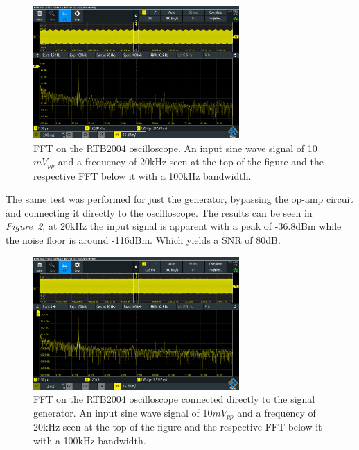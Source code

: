 \begin{figure}[h]
    \centering
    \includegraphics[width=0.7\textwidth]{graphics/Noise20k10mVpp100kband.PNG}
    \caption{FFT on the RTB2004 oscilloscope. An input sine wave signal of 10$mV_{pp}$ and a frequency of 20kHz seen at the top of the figure and the respective FFT below it with a 100kHz bandwidth.}
    \label{fig:Noise20k10mVpp100kband}
\end{figure}





The same test was performed for just the generator, bypassing the op-amp circuit and connecting it directly to the oscilloscope.
The results can be seen in \textit{Figure~\ref{fig:NoiseGenerator20kInp100kBand}}, at 20kHz the input signal is apparent with a peak of -36.8dBm while the noise floor is around -116dBm.
Which yields a SNR of 80dB.

\begin{figure}[h]
    \centering
    \includegraphics[width=0.7\textwidth]{graphics/NoiseGenerator20kInp100kBand.PNG}
    \caption{FFT on the RTB2004 oscilloscope connected directly to the signal generator. 
    An input sine wave signal of 10$mV_{pp}$ and a frequency of 20kHz seen at the top of the figure and the respective FFT below it with a 100kHz bandwidth.}
    \label{fig:NoiseGenerator20kInp100kBand}
\end{figure}

